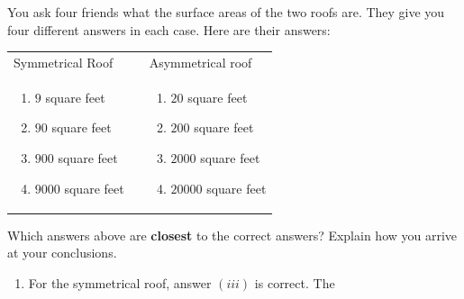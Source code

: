 \documentclass[handout,nooutcomes,noauthor,hints]{ximera}
\begin{document}
\begin{question}
\begin{center}
\begin{tikzpicture}[x=1.5cm,y=1.5cm]
    \end{tikzpicture}
    \qquad
  \end{center}
  You ask four friends what the surface areas of the two roofs
  are. They give you four different answers in each case. Here are
  their answers:
  \begin{center}
    \begin{tabular}{lll}
      Symmetrical Roof &\hspace{1in} & Asymmetrical roof\\
    \begin{minipage}{2in}\begin{enumerate}
    \item $9$ square feet
    \item $90$ square feet
    \item $900$ square feet
    \item $9000$ square feet
    \end{enumerate} 
    \end{minipage}
    & &
    \begin{minipage}{2in} \begin{enumerate}
    \item $20$ square feet
    \item $200$ square feet
    \item $2000$ square feet
    \item $20000$ square feet
      \end{enumerate}
    \end{minipage}
    \end{tabular}
  \end{center}
  Which answers above are \textbf{closest} to the correct answers?
  Explain how you arrive at your conclusions.
  \begin{freeResponse}
    \begin{enumerate}
    \item For the symmetrical roof, answer $(iii)$ is correct. The

\end{enumerate}
\end{freeResponse}
\end{question}
\end{document}
